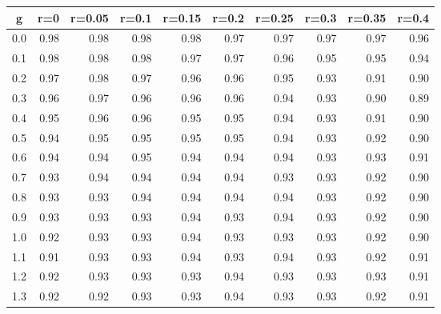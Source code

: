 %
\begin{table}[!tbp]
 \begin{center}
 \begin{tabular}{rrrrrrrrrr}\hline\hline
\multicolumn{1}{c}{g}&\multicolumn{1}{c}{r=0}&\multicolumn{1}{c}{r=0.05}&\multicolumn{1}{c}{r=0.1}&\multicolumn{1}{c}{r=0.15}&\multicolumn{1}{c}{r=0.2}&\multicolumn{1}{c}{r=0.25}&\multicolumn{1}{c}{r=0.3}&\multicolumn{1}{c}{r=0.35}&\multicolumn{1}{c}{r=0.4}\tabularnewline
\hline
0.0&0.98&0.98&0.98&0.98&0.97&0.97&0.97&0.97&0.96\tabularnewline
0.1&0.98&0.98&0.98&0.97&0.97&0.96&0.95&0.95&0.94\tabularnewline
0.2&0.97&0.98&0.97&0.96&0.96&0.95&0.93&0.91&0.90\tabularnewline
0.3&0.96&0.97&0.96&0.96&0.96&0.94&0.93&0.90&0.89\tabularnewline
0.4&0.95&0.96&0.96&0.95&0.95&0.94&0.93&0.91&0.90\tabularnewline
0.5&0.94&0.95&0.95&0.95&0.95&0.94&0.93&0.92&0.90\tabularnewline
0.6&0.94&0.94&0.95&0.94&0.94&0.94&0.93&0.93&0.91\tabularnewline
0.7&0.93&0.94&0.94&0.94&0.94&0.93&0.93&0.92&0.90\tabularnewline
0.8&0.93&0.93&0.94&0.94&0.94&0.94&0.93&0.92&0.90\tabularnewline
0.9&0.93&0.93&0.93&0.94&0.93&0.94&0.93&0.92&0.90\tabularnewline
1.0&0.92&0.93&0.93&0.94&0.93&0.93&0.93&0.92&0.90\tabularnewline
1.1&0.91&0.93&0.93&0.94&0.93&0.94&0.93&0.92&0.91\tabularnewline
1.2&0.92&0.93&0.93&0.93&0.94&0.93&0.93&0.93&0.91\tabularnewline
1.3&0.92&0.92&0.93&0.93&0.94&0.93&0.93&0.92&0.91\tabularnewline
\hline
\end{tabular}

\end{center}

\end{table}

